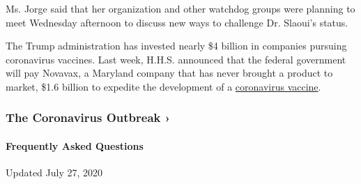 Ms. Jorge said that her organization and other watchdog groups were
planning to meet Wednesday afternoon to discuss new ways to challenge
Dr. Slaoui's status.

The Trump administration has invested nearly \$4 billion in companies
pursuing coronavirus vaccines. Last week, H.H.S. announced that the
federal government will pay Novavax, a Maryland company that has never
brought a product to market, \$1.6 billion to expedite the development
of a
\href{https://www.nytimes.com/2020/07/14/health/coronavirus-nasal-vaccines.html}{coronavirus
vaccine}.

\href{https://www.nytimes.com/news-event/coronavirus?action=click\&pgtype=Article\&state=default\&region=MAIN_CONTENT_3\&context=storylines_faq}{}

\hypertarget{the-coronavirus-outbreak-}{%
\subsubsection{The Coronavirus Outbreak
›}\label{the-coronavirus-outbreak-}}

\hypertarget{frequently-asked-questions}{%
\paragraph{Frequently Asked
Questions}\label{frequently-asked-questions}}

Updated July 27, 2020

